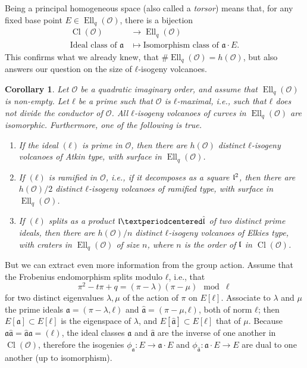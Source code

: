 \documentclass[10pt]{article}
\theoremstyle{plain}
\newtheorem{corollary}[theorem]{Corollary}
\theoremstyle{definition}
\DeclareMathOperator{\Cl}{Cl}
\DeclareMathOperator{\Ell}{Ell}
\def\O{\ensuremath{\mathcal{O}}}
\def\a{\ensuremath{\mathfrak{a}}}
\begin{document}
Being a principal homogeneous space (also called a \emph{torsor})
means that, for any fixed base point $E∈\Ell_q(\O)$, there is a
bijection
\[
\begin{aligned}
\Cl(\O) &\longrightarrow \Ell_q(\O) \\
\text{Ideal class of }\a &\longmapsto \text{Isomorphism class of }\a\cdot E.
\end{aligned}
\]
This confirms what we already knew, that $\#\Ell_q(\O)=h(\O)$, but
also answers our question on the size of $ℓ$-isogeny volcanoes.

\begin{corollary}
  Let $\O$ be a quadratic imaginary order, and assume that
  $\Ell_q(\O)$ is non-empty. %
  Let $ℓ$ be a prime such that $\O$ is $ℓ$-maximal, i.e., such that
  $ℓ$ does not divide the conductor of $\O$. %
  All $ℓ$-isogeny volcanoes of curves in $\Ell_q(\O)$ are
  isomorphic. %
  Furthermore, one of the following is true.
  \begin{enumerate}
  \item[(0)] If the ideal $(ℓ)$ is prime in $\O$, then there are
    $h(\O)$ distinct $ℓ$-isogeny volcanoes of Atkin type, with surface
    in $\Ell_q(\O)$.
  \item[(1)] If $(ℓ)$ is ramified in $\O$, i.e., if it decomposes as a
    square $\frak l^2$, then there are $h(\O)/2$ distinct $ℓ$-isogeny
    volcanoes of ramified type, with surface in $\Ell_q(\O)$.
  \item[(2)] If $(ℓ)$ splits as a product $\frak l·\hat{\frak l}$ of
    two distinct prime ideals, then there are $h(\O)/n$ distinct
    $ℓ$-isogeny volcanoes of Elkies type, with craters in $\Ell_q(\O)$
    of size $n$, where $n$ is the order of $\frak l$ in $\Cl(\O)$.
  \end{enumerate}
\end{corollary}

But we can extract even more information from the group action. %
Assume that the Frobenius endomorphism splits modulo $ℓ$, i.e., that
\[π^2 - tπ + q = (π - λ)(π - μ) \mod\ell\] %
for two distinct eigenvalues $λ,μ$ of the action of $π$ on $E[ℓ]$. %
Associate to $λ$ and $μ$ the prime ideals $\a=(π-λ,ℓ)$ and
$\hat{\a}=(π-μ,ℓ)$, both of norm $ℓ$; then $E[\a]⊂E[ℓ]$ is the
eigenspace of $λ$, and $E[\hat{\a}]⊂E[ℓ]$ that of $μ$. %
Because $\a\hat{\a} = \hat{\a}\a = (ℓ)$, the ideal classes $\a$ and
$\hat{\a}$ are the inverse of one another in $\Cl(\O)$, therefore the
isogenies $ϕ_{\a}:E→\a·E$ and $ϕ_{\hat{\a}}:\a·E→E$ are dual to one
another (up to isomorphism). %
\end{document}
